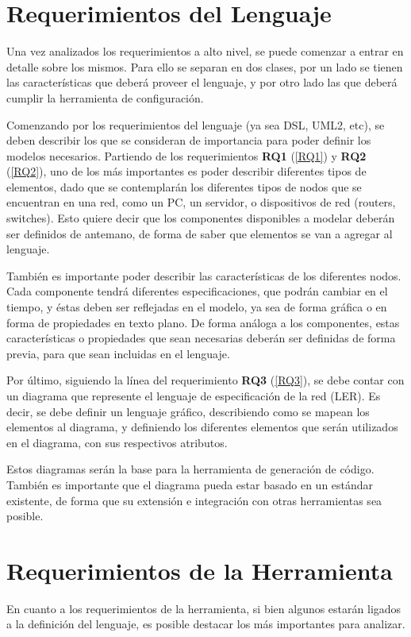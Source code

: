 \section{Requerimientos del Lenguaje} \label{Requerimientos del Lenguaje}
Una vez analizados los requerimientos a alto nivel, se puede comenzar a entrar en detalle sobre los mismos. Para ello se separan en dos clases, por un lado se tienen las características que deberá proveer el lenguaje, y por otro lado las que deberá cumplir la herramienta de configuración.

Comenzando por los requerimientos del lenguaje (ya sea DSL, UML2, etc), se deben describir los que se consideran de importancia para poder definir los modelos necesarios. Partiendo de los requerimientos \textbf{RQ1} (\ref{RQ1}) y \textbf{RQ2} (\ref{RQ2}), uno de los más importantes es poder describir diferentes tipos de elementos, dado que se contemplarán los diferentes tipos de nodos que se encuentran en una red, como un PC, un servidor, o dispositivos de red (routers, switches). Esto quiere decir que los componentes disponibles a modelar deberán ser definidos de antemano, de forma de saber que elementos se van a agregar al lenguaje.

También es importante poder describir las características de los diferentes nodos. Cada componente tendrá diferentes especificaciones, que podrán cambiar en el tiempo, y éstas deben ser reflejadas en el modelo, ya sea de forma gráfica o en forma de propiedades en texto plano. De forma análoga a los componentes, estas características o propiedades que sean necesarias deberán ser definidas de forma previa, para que sean incluidas en el lenguaje.

Por último, siguiendo la línea del requerimiento \textbf{RQ3} (\ref{RQ3}), se debe contar con un diagrama que represente el lenguaje de especificación de la red (LER). Es decir, se debe definir un lenguaje gráfico, describiendo como se mapean los elementos al diagrama, y definiendo los diferentes elementos que serán utilizados en el diagrama, con sus respectivos atributos. 

Estos diagramas serán la base para la herramienta de generación de código. También es importante que el diagrama pueda estar basado en un estándar existente, de forma que su extensión e integración con otras herramientas sea posible.

\section{Requerimientos de la Herramienta} \label{Requerimientos de la Herramienta}
En cuanto a los requerimientos de la herramienta, si bien algunos estarán ligados a la definición del lenguaje, es posible destacar los más importantes para analizar.


